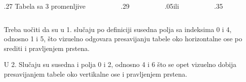 \begin{frame}[label=02-s035]
\gusttekst
\begin{columns}[c,onlytextwidth]
\begin{column}{.27\textwidth}
Tabela sa 3 promenljive
\end{column}
\begin{column}{.29\textwidth}\centering

\end{column}
\begin{column}{.05\textwidth}\centering ili\end{column}
\begin{column}{.35\textwidth}\centering

\end{column}
\end{columns}

Treba uočiti da su u 1. slučaju po definiciji susedna polja sa indeksima 0 i 4, odnosno 1 i 5, što vizuelno odgovara presavijanju tabele oko horizontalne ose po srediti i pravljenjem prstena.

U 2. Slučaju su susedna i polja 0 i 2, odnosno 4 i 6 što se opet vizuelno dobija presavijanjem tabele oko vertikalne ose i pravljenjem prstena.
\end{frame}
